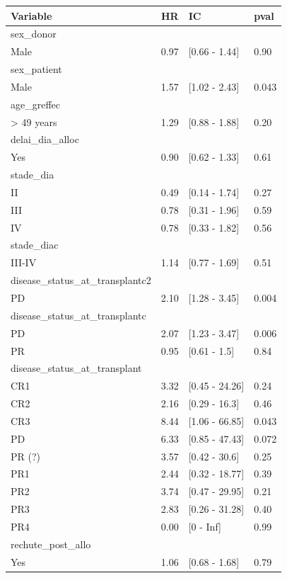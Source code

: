 \documentclass[a4paper,11pt] {article}
\begin{document}
\begin{longtable}{lrll}
  \hline
Variable & HR & IC & pval \\ 
  \hline
sex_donor &  &  &  \\ 
  Male & 0.97 & [0.66 - 1.44] & 0.90 \\ 
  sex_patient &  &  &  \\ 
  Male & 1.57 & [1.02 - 2.43] & 0.043 \\ 
  age_greffec &  &  &  \\ 
  > 49 years & 1.29 & [0.88 - 1.88] & 0.20 \\ 
  delai_dia_alloc &  &  &  \\ 
  Yes & 0.90 & [0.62 - 1.33] & 0.61 \\ 
  stade_dia &  &  &  \\ 
  II & 0.49 & [0.14 - 1.74] & 0.27 \\ 
  III & 0.78 & [0.31 - 1.96] & 0.59 \\ 
  IV & 0.78 & [0.33 - 1.82] & 0.56 \\ 
  stade_diac &  &  &  \\ 
  III-IV & 1.14 & [0.77 - 1.69] & 0.51 \\ 
  disease_status_at_transplantc2 &  &  &  \\ 
  PD & 2.10 & [1.28 - 3.45] & 0.004 \\ 
  disease_status_at_transplantc &  &  &  \\ 
  PD & 2.07 & [1.23 - 3.47] & 0.006 \\ 
  PR & 0.95 & [0.61 - 1.5] & 0.84 \\ 
  disease_status_at_transplant &  &  &  \\ 
  CR1 & 3.32 & [0.45 - 24.26] & 0.24 \\ 
  CR2 & 2.16 & [0.29 - 16.3] & 0.46 \\ 
  CR3 & 8.44 & [1.06 - 66.85] & 0.043 \\ 
  PD & 6.33 & [0.85 - 47.43] & 0.072 \\ 
  PR (?) & 3.57 & [0.42 - 30.6] & 0.25 \\ 
  PR1 & 2.44 & [0.32 - 18.77] & 0.39 \\ 
  PR2 & 3.74 & [0.47 - 29.95] & 0.21 \\ 
  PR3 & 2.83 & [0.26 - 31.28] & 0.40 \\ 
  PR4 & 0.00 & [0 - Inf] & 0.99 \\ 
  rechute_post_allo &  &  &  \\ 
  Yes & 1.06 & [0.68 - 1.68] & 0.79 \\ 

\end{longtable}
\end{document}
